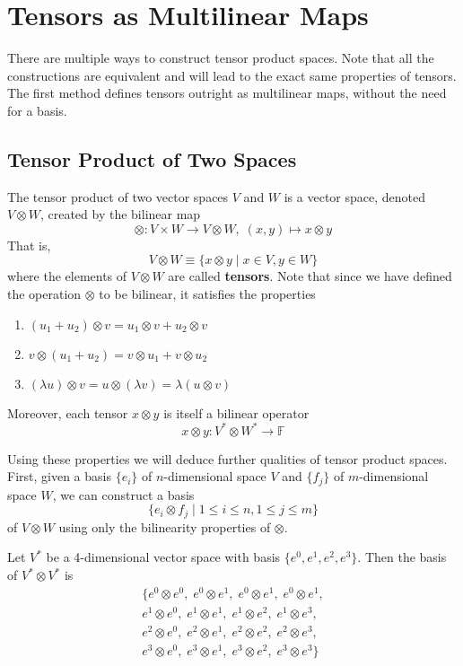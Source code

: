 \section{Tensors as Multilinear Maps}

  There are multiple ways to construct tensor product spaces. Note that all the constructions are equivalent and will lead to the exact same properties of tensors. The first method defines tensors outright as multilinear maps, without the need for a basis. 

\subsection{Tensor Product of Two Spaces}

  \begin{definition}
  The tensor product of two vector spaces $V$ and $W$ is a vector space, denoted $V \otimes W$, created by the bilinear map 
  \[\otimes: V \times W \longrightarrow V \otimes W, \; (x, y) \mapsto x \otimes y\]
  That is, 
  \[V \otimes W \equiv \{ x \otimes y \; | \; x \in V, y \in W\} \]
  where the elements of $V \otimes W$ are called \textbf{tensors}. Note that since we have defined the operation $\otimes$ to be bilinear, it satisfies the properties
  \begin{enumerate}
      \item $(u_1 + u_2) \otimes v = u_1 \otimes v + u_2 \otimes v$
      \item $v \otimes (u_1 + u_2) = v \otimes u_1 + v \otimes u_2$
      \item $(\lambda u) \otimes v = u \otimes (\lambda v) = \lambda (u \otimes v)$ 
  \end{enumerate}
  Moreover, each tensor $x \otimes y$ is itself a bilinear operator
  \[x \otimes y: V^* \otimes W^* \longrightarrow \mathbb{F}\]
  \end{definition}

  Using these properties we will deduce further qualities of tensor product spaces. First, given a basis $\{e_i\}$ of $n$-dimensional space $V$ and $\{f_j\}$ of $m$-dimensional space $W$, we can construct a basis 
  \[\{e_i \otimes f_j \; | \; 1 \leq i \leq n, 1 \leq j \leq m\}\]
  of $V \otimes W$ using only the bilinearity properties of $\otimes$. 

  \begin{example}
  Let $V^*$ be a 4-dimensional vector space with basis $\{ e^0, e^1, e^2, e^3\}$. Then the basis of $V^* \otimes V^*$ is
  \begin{align*} 
  \{e^0 \otimes e^0, \; e^0 \otimes e^1, \;e^0 \otimes e^1, \;e^0 \otimes e^1, \\
  e^1 \otimes e^0,\; e^1 \otimes e^1,\; e^1 \otimes e^2,\; e^1 \otimes e^3, \\
  e^2 \otimes e^0,\; e^2 \otimes e^1,\; e^2 \otimes e^2,\; e^2 \otimes e^3, \\
  e^3 \otimes e^0,\; e^3 \otimes e^1,\; e^3 \otimes e^2,\; e^3 \otimes e^3\}
  \end{align*}
  \end{example}

